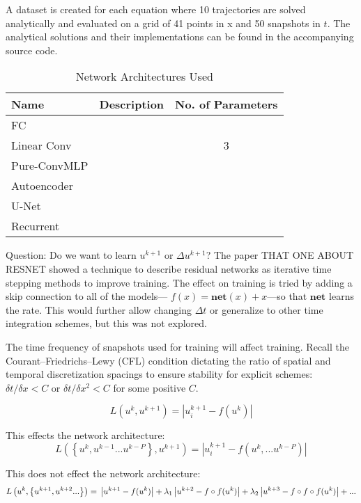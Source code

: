 \documentclass{article}
\begin{document}
A dataset is created for each equation where 10 trajectories are solved analytically and evaluated on a grid of 41 points in x and 50 snapshots in $t$. The analytical solutions and their implementations can be found in the accompanying source code.

\begin{table}
  \caption{\label{tab:network}Network Architectures Used}
  \begin{tabular}{lcc}
    \toprule
    Name & Description & No. of Parameters \\
    \midrule
    FC & & \\
    Linear Conv & & 3 \\
    Pure-ConvMLP & &  \\
    Autoencoder & & \\
    U-Net & &  \\
    Recurrent & & \\
    \bottomrule
  \end{tabular}
\end{table}

Question: Do we want to learn $u^{k+1}$ or $\Delta u^{k+1}$?
The paper THAT ONE ABOUT RESNET showed a technique to describe residual networks as iterative time stepping methods to improve training. The effect on training is tried by adding a skip connection to all of the models--- $f(x)=\mathbf{net}(x)+x$---so that $\mathbf{net}$ learns the rate. This would further allow changing $\Delta t$ or generalize to other time integration schemes, but this was not explored.

The time frequency of snapshots used for training will affect training.
Recall the Courant–Friedrichs–Lewy (CFL) condition dictating the ratio
of spatial and temporal discretization spacings to ensure stability
for explicit schemes: $\delta t / \delta x < C$ or $\delta t / \delta
x^2<C$ for some positive $C$.

\begin{equation}
L\left(u^k,u^{k+1}\right) = \left| u^{k+1}_i-f(u^k) \right|
\end{equation}

This effects the network architecture:
\begin{equation}
L\left(\left\{u^k,u^{k-1}...u^{k-P}\right\},u^{k+1}\right) = \left| u^{k+1}_i-f(u^k,...u^{k-P}) \right|
\end{equation}

This does not effect the network architecture:
\begin{equation}
L\left(u^k,\left\{u^{k+1},u^{k+2}...\right\}\right) = \\ \left| u^{k+1}-f(u^k) \right| + \lambda_1  \left| u^{k+2}-f \circ f(u^k) \right| + \lambda_2  \left| u^{k+3}-f \circ f \circ f(u^k) \right| + ...
\end{equation}
\end{document}
